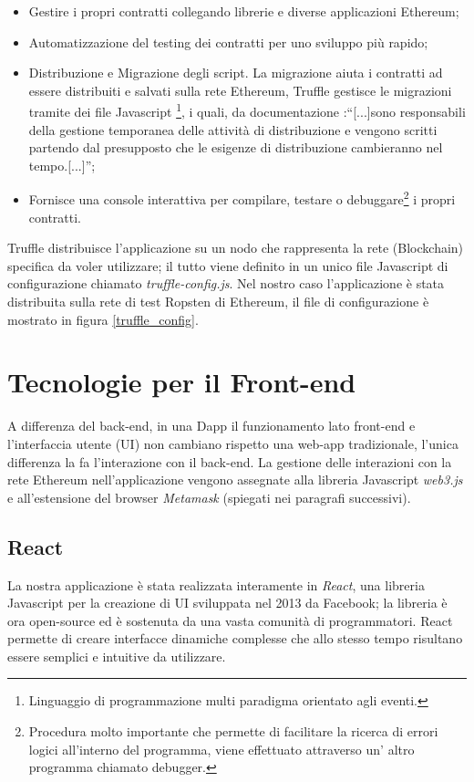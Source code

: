 \begin{itemize}
\item Gestire i propri contratti collegando librerie e diverse applicazioni Ethereum;
\item Automatizzazione del testing dei contratti per uno sviluppo più rapido;
\item Distribuzione e Migrazione degli script. La migrazione aiuta i contratti ad essere distribuiti e salvati sulla rete Ethereum, Truffle gestisce le migrazioni tramite dei file Javascript \footnote{Linguaggio di programmazione multi paradigma orientato agli eventi.}, i quali, da documentazione \cite{Truffle_migration}:“[...]sono responsabili della gestione temporanea delle attività di distribuzione e vengono scritti partendo dal presupposto che le esigenze di distribuzione cambieranno nel tempo.[...]”;
\item Fornisce una console interattiva per compilare, testare o debuggare\footnote{Procedura molto importante che permette di facilitare  la ricerca di errori logici all'interno del programma, viene effettuato attraverso un' altro programma chiamato debugger.} i propri contratti.
\end{itemize}

Truffle distribuisce l'applicazione su un nodo che rappresenta la rete (Blockchain) specifica da voler utilizzare; il tutto viene definito in un unico file Javascript di configurazione chiamato \textit{truffle-config.js}.
Nel nostro caso l'applicazione è stata distribuita sulla rete di test Ropsten di Ethereum, il file di configurazione è mostrato in figura \ref{truffle_config}.

\section{Tecnologie per il Front-end}\label{front-end}
A differenza del back-end, in una Dapp il funzionamento lato front-end e l'interfaccia utente (UI) non cambiano rispetto una web-app tradizionale, l'unica differenza la fa l'interazione con il back-end.
La gestione delle interazioni con la rete Ethereum nell'applicazione vengono assegnate alla libreria Javascript \textit{web3.js} e all'estensione del browser \textit{Metamask} (spiegati nei paragrafi successivi).

\subsection{React}\label{React}
La nostra applicazione è stata realizzata interamente in \textit{React}\cite{React}, una libreria Javascript per la creazione di UI sviluppata nel 2013 da Facebook; la libreria è ora open-source ed è sostenuta da una vasta comunità di programmatori. 
React permette di creare interfacce dinamiche complesse che allo stesso tempo risultano essere semplici e intuitive da utilizzare.

